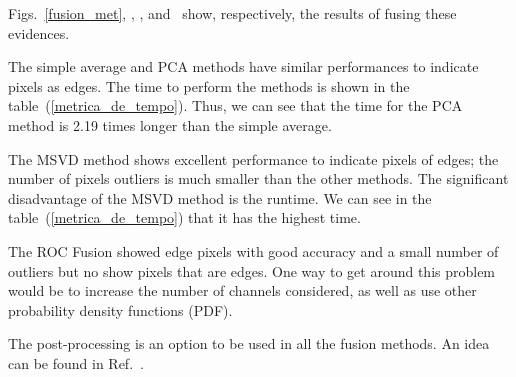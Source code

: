 \documentclass[journal]{IEEEtran}
\begin{document}
Figs.~\ref{fusion_met}, , , and~ show, respectively, the results of fusing these evidences. 

The simple average and PCA methods have similar performances to indicate pixels as edges. The time to perform the methods is shown in the table~(\ref{metrica_de_tempo}). Thus, we can see that the time for the PCA method is 2.19 times longer than the simple average.  

The MSVD method shows excellent performance to indicate pixels of edges; the number of pixels outliers is much smaller than the other methods. The significant disadvantage of the MSVD method is the runtime. We can see in the table~(\ref{metrica_de_tempo}) that it has the highest time.

The ROC Fusion showed edge pixels with good accuracy and a small number of outliers but no show pixels that are edges. One way to get around this problem would be to increase the number of channels considered, as well as use other probability density functions (PDF).

The post-processing is an option to be used in all the fusion methods. An idea can be found in Ref.~\cite{gmbf}. 
\end{document}
